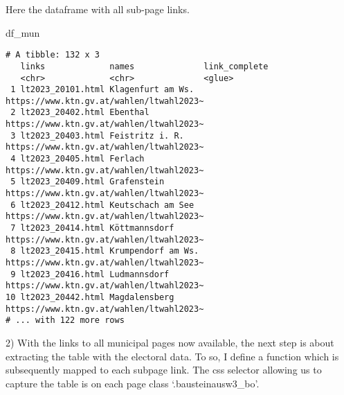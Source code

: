 \documentclass[
  letterpaper,
  DIV=11,
  numbers=noendperiod,
  oneside]{scrartcl}
\newenvironment{Shaded}{\begin{snugshade}}{\end{snugshade}}
\newcommand{\NormalTok}[1]{\textcolor[rgb]{0.00,0.23,0.31}{#1}}
\begin{document}
Here the dataframe with all sub-page links.

\begin{Shaded}
\begin{Highlighting}[]
\NormalTok{df\_mun }
\end{Highlighting}
\end{Shaded}

\begin{verbatim}
# A tibble: 132 x 3
   links             names              link_complete                           
   <chr>             <chr>              <glue>                                  
 1 lt2023_20101.html Klagenfurt am Ws.  https://www.ktn.gv.at/wahlen/ltwahl2023~
 2 lt2023_20402.html Ebenthal           https://www.ktn.gv.at/wahlen/ltwahl2023~
 3 lt2023_20403.html Feistritz i. R.    https://www.ktn.gv.at/wahlen/ltwahl2023~
 4 lt2023_20405.html Ferlach            https://www.ktn.gv.at/wahlen/ltwahl2023~
 5 lt2023_20409.html Grafenstein        https://www.ktn.gv.at/wahlen/ltwahl2023~
 6 lt2023_20412.html Keutschach am See  https://www.ktn.gv.at/wahlen/ltwahl2023~
 7 lt2023_20414.html Köttmannsdorf      https://www.ktn.gv.at/wahlen/ltwahl2023~
 8 lt2023_20415.html Krumpendorf am Ws. https://www.ktn.gv.at/wahlen/ltwahl2023~
 9 lt2023_20416.html Ludmannsdorf       https://www.ktn.gv.at/wahlen/ltwahl2023~
10 lt2023_20442.html Magdalensberg      https://www.ktn.gv.at/wahlen/ltwahl2023~
# ... with 122 more rows
\end{verbatim}

2) With the links to all municipal pages now available, the next step is
about extracting the table with the electoral data. To so, I define a
function which is subsequently mapped to each subpage link. The css
selector allowing us to capture the table is on each page class
`.bausteinausw3\_bo'.
\end{document}
